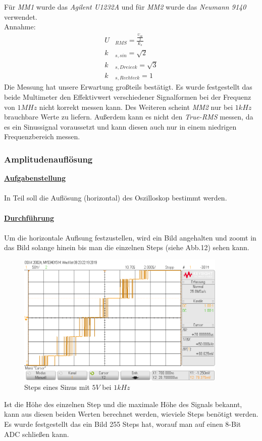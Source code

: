 \documentclass[a4paper,12pt]{article}
\begin{document}
	\newline
	Für \textit{MM1} wurde das \textit{Agilent U1232A} und für \textit{MM2} wurde das \textit{Neumann 9140} verwendet. \\
	Annahme:
	\begin{align*}
		U&_{RMS} = \frac{\frac{U_{pp}}{2}}{k_s} \\
		k&_{s,sin} = \sqrt{2} \\
		k&_{s,Dreieck} = \sqrt{3} \\
		k&_{s,Rechteck} = 1
	\end{align*}
	\newline
	Die Messung hat unsere Erwartung großteils bestätigt. Es wurde festgestellt das beide Multimeter den Effektivwert verschiedener Signalformen bei der Frequenz von $1MHz$ nicht korrekt messen kann. Des Weiteren scheint \textit{MM2} nur bei $1kHz$ brauchbare Werte zu liefern. Außerdem kann es nicht den \textit{True-RMS} messen, da es ein Sinussignal voraussetzt und kann diesen auch nur in einem niedrigen Frequenzbereich messen.
	\subsubsection{Amplitudenauflösung}
	\underline{\textbf{Aufgabenstellung}} \\ \\
	In Teil soll die Auflösung (horizontal) des Oszilloskop bestimmt werden.\\ \\
	\underline{\textbf{Durchführung}} \\ \\
	Um die horizontale Auflsung festzustellen, wird ein Bild angehalten und zoomt in das Bild solange hinein bis man die einzelnen Steps (siehe Abb.12) sehen kann.
	\begin{figure}[h]
		\centering
		\includegraphics[width=10cm]{img/Auflo}
		\caption{Steps eines Sinus mit $5V$ bei $1kHz$}
	\end{figure}
	\newline
	Ist die Höhe des einzelnen Step und die maximale Höhe des Signals bekannt, kann aus diesen beiden Werten berechnet werden, wieviele Steps benötigt werden. Es wurde festgestellt das ein Bild 255 Steps hat, worauf man auf einen 8-Bit ADC schließen kann.
	\newpage
\end{document}
